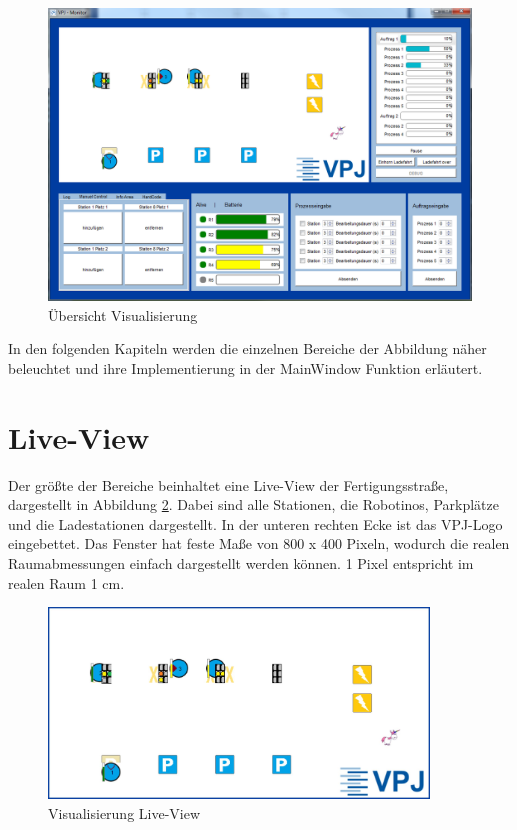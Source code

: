 \begin{figure}[htb]
    \centering
    \includegraphics[width=1\textwidth]{Abbildungen/Gesamtprogramm.png}
    \caption{Übersicht Visualisierung}		
    \label{fig:Gesamtprogramm}
\end{figure}

In den folgenden Kapiteln werden die einzelnen Bereiche der Abbildung näher beleuchtet und ihre Implementierung in der MainWindow Funktion erläutert. 

\section{Live-View}

Der größte der Bereiche beinhaltet eine Live-View der Fertigungsstraße, dargestellt in Abbildung \ref{fig:LiveView}. Dabei sind alle Stationen, die Robotinos, Parkplätze und die Ladestationen dargestellt. In der unteren rechten Ecke ist das VPJ-Logo eingebettet. Das Fenster hat feste Maße von 800 x 400 Pixeln, wodurch die realen Raumabmessungen einfach dargestellt werden können. 1 Pixel entspricht im realen Raum 1 cm. 

\begin{figure}[htb]
    \centering
    \includegraphics[width=0.9\textwidth]{Abbildungen/LiveView.png}
    \caption{Visualisierung Live-View}		
    \label{fig:LiveView}
\end{figure}

